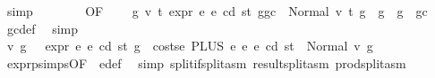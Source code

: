 \begin{isabellebody}
\ simp\isanewline
\ \ \ \ \ \ \isamarkupfalse%
\ {}{}{\isacharparenleft}{\kern0pt}{}{\isacharparenright}{\kern0pt}{\isacharbrackleft}{\kern0pt}OF\ {\isacharasterisk}{\kern0pt}\ {\isacharasterisk}{\kern0pt}{\isacharasterisk}{\kern0pt}{\isacharbrackright}{\kern0pt}\ \isamarkupfalse%
\ {\isachardoublequoteopen}{\isasymAnd}g{}{\isacharprime}{\kern0pt}\ v{}\ t{}{\isachardot}{\kern0pt}\ expr\ e{}\ e\ cd\ st\ {\isacharparenleft}{\kern0pt}g{\isacharminus}{\kern0pt}gc{\isacharparenright}{\kern0pt}\ {\isacharequal}{\kern0pt}\ Normal\ {\isacharparenleft}{\kern0pt}{\isacharparenleft}{\kern0pt}v{}{\isacharcomma}{\kern0pt}\ t{}{\isacharparenright}{\kern0pt}{\isacharcomma}{\kern0pt}\ g{}{\isacharprime}{\kern0pt}{\isacharparenright}{\kern0pt}\ {\isasymLongrightarrow}\ g{}{\isacharprime}{\kern0pt}\ {\isasymle}\ g\ {\isacharminus}{\kern0pt}\ gc{\isachardoublequoteclose}\ \isamarkupfalse%
\ gc{\isacharunderscore}{\kern0pt}def\ \isamarkupfalse%
\ simp\isanewline
\ \ \ \ \ \ \isamarkupfalse%
\ \isamarkupfalse%
\ v\ g{\isacharprime}{\kern0pt}\ \ {\isacharasterisk}{\kern0pt}{\isacharasterisk}{\kern0pt}{\isacharasterisk}{\kern0pt}{\isacharcolon}{\kern0pt}\ {\isachardoublequoteopen}expr\ e{}\ e\ cd\ st\ {\isacharparenleft}{\kern0pt}g\ {\isacharminus}{\kern0pt}\ costs\isactrlsub e\ {\isacharparenleft}{\kern0pt}PLUS\ e{}\ e{}{\isacharparenright}{\kern0pt}\ e\ cd\ st{\isacharparenright}{\kern0pt}\ {\isacharequal}{\kern0pt}\ Normal\ {\isacharparenleft}{\kern0pt}v{\isacharcomma}{\kern0pt}\ g{\isacharprime}{\kern0pt}{\isacharparenright}{\kern0pt}{\isachardoublequoteclose}\ \isamarkupfalse%
\ expr{\isachardot}{\kern0pt}psimps{\isacharparenleft}{\kern0pt}{}{}{\isacharparenright}{\kern0pt}{\isacharbrackleft}{\kern0pt}OF\ {}{}{\isacharparenleft}{\kern0pt}{}{\isacharparenright}{\kern0pt}{\isacharbrackright}{\kern0pt}\ e{\isacharunderscore}{\kern0pt}def\ \isamarkupfalse%
\ {\isacharparenleft}{\kern0pt}simp\ split{\isacharcolon}{\kern0pt}if{\isacharunderscore}{\kern0pt}split{\isacharunderscore}{\kern0pt}asm\ result{\isachardot}{\kern0pt}split{\isacharunderscore}{\kern0pt}asm\ prod{\isachardot}{\kern0pt}split{\isacharunderscore}{\kern0pt}asm{\isacharparenright}{\kern0pt}\isanewline
\ \ \ \ \ \ \isamarkupfalse%

\end{isabellebody}
